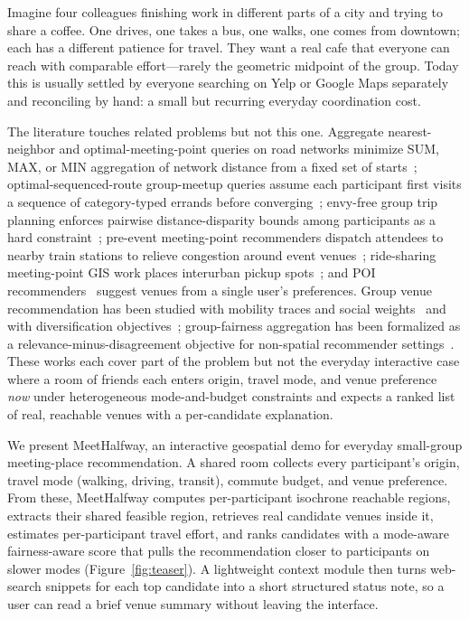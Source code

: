\documentclass[sigconf]{acmart}
\begin{document}
Imagine four colleagues finishing work in different parts of a city and trying to share a coffee. One drives, one takes a bus, one walks, one comes from downtown; each has a different patience for travel. They want a real cafe that everyone can reach with comparable effort---rarely the geometric midpoint of the group. Today this is usually settled by everyone searching on Yelp or Google Maps separately and reconciling by hand: a small but recurring everyday coordination cost.

The literature touches related problems but not this one. Aggregate nearest-neighbor and optimal-meeting-point queries on road networks minimize SUM, MAX, or MIN aggregation of network distance from a fixed set of starts~\cite{papadias2005ann,yan2011omp,kim2023meeting}; optimal-sequenced-route group-meetup queries assume each participant first visits a sequence of category-typed errands before converging~\cite{chen2021groupmeetup}; envy-free group trip planning enforces pairwise distance-disparity bounds among participants as a hard constraint~\cite{singhal2022envyfree}; pre-event meeting-point recommenders dispatch attendees to nearby train stations to relieve congestion around event venues~\cite{asukai2018meeting}; ride-sharing meeting-point GIS work places interurban pickup spots~\cite{czioska2017gis,czioska2017location,khetarpaul2012mining}; and POI recommenders~\cite{sanchez2022poi,liu2013poi,wang2024embracing} suggest venues from a single user's preferences. Group venue recommendation has been studied with mobility traces and social weights~\cite{zhang2019gevr} and with diversification objectives~\cite{dacruz2024diversification}; group-fairness aggregation has been formalized as a relevance-minus-disagreement objective for non-spatial recommender settings~\cite{ameryahia2009group,stratigi2020fair,wang2023fairness}. These works each cover part of the problem but not the everyday interactive case where a room of friends each enters origin, travel mode, and venue preference \emph{now} under heterogeneous mode-and-budget constraints and expects a ranked list of real, reachable venues with a per-candidate explanation.

We present MeetHalfway, an interactive geospatial demo for everyday small-group meeting-place recommendation. A shared room collects every participant's origin, travel mode (walking, driving, transit), commute budget, and venue preference. From these, MeetHalfway computes per-participant isochrone reachable regions, extracts their shared feasible region, retrieves real candidate venues inside it, estimates per-participant travel effort, and ranks candidates with a mode-aware fairness-aware score that pulls the recommendation closer to participants on slower modes (Figure~\ref{fig:teaser}). A lightweight context module then turns web-search snippets for each top candidate into a short structured status note, so a user can read a brief venue summary without leaving the interface.
\end{document}
